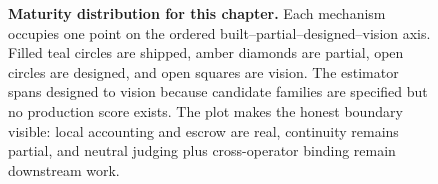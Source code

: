 \begin{figure}[H]
{}
\caption{\textbf{Maturity distribution for this chapter.} Each mechanism occupies
one point on the ordered built--partial--designed--vision axis. Filled teal circles
are shipped, amber diamonds are partial, open circles are designed, and open
squares are vision. The estimator spans designed to vision because candidate
families are specified but no production score exists. The plot makes the honest
boundary visible: local accounting and escrow are real, continuity remains
partial, and neutral judging plus cross-operator binding remain downstream work.}
\label{fig:honest-state}
\end{figure}
